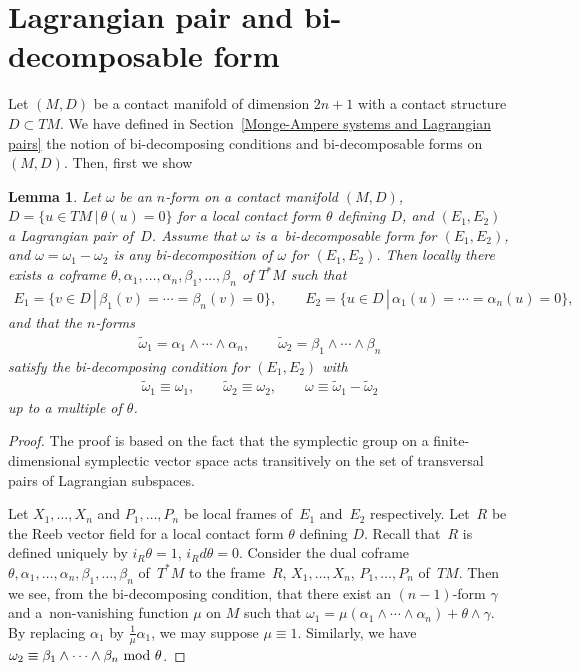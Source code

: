 \documentclass[11pt]{article}
\newtheorem{Lem}[Th]{Lemma}
{ \theoremstyle{definition}
\newtheorem{Def}[Th]{Definition}
\newtheorem{Rem}[Th]{Remark}
\newtheorem{Ex}[Th]{Example}}
\begin{document}
\section{Lagrangian pair and bi-decomposable form}
\label{Lagrangian pair and bi-decomposable forms.}

Let $(M, D)$ be a contact manifold of dimension $2n+1$ with
a contact structure $D \subset TM$.
We have def\/ined in Section~\ref{Monge-Ampere systems and Lagrangian pairs} the notion of bi-decomposing
conditions and bi-decomposable forms on~$(M, D)$.
Then, f\/irst we show

\begin{Lem}
\label{bi-decomposability}
Let $\omega$ be an $n$-form on a contact manifold $(M, D)$,
$D = \{ u \in TM \,|\, \theta(u) = 0\}$
for a local contact form $\theta$ defining $D$,
and $(E_1, E_2)$
a Lagrangian pair of~$D$.
Assume that $\omega$ is
a~bi-decomposable form for $(E_1, E_2)$,
and $\omega = \omega_1 - \omega_2$ is
any bi-decomposition of $\omega$ for $(E_1, E_2)$.
Then locally there exists a coframe
$\theta, \alpha_1, \dots, \alpha_n, \beta_1, \dots, \beta_n$
of $T^*M$ such that
\begin{gather*}
E_1 = \{ v \in D \,|\, \beta_1(v) = \cdots = \beta_n(v) = 0\}, \qquad
E_2 = \{ u \in D \,|\, \alpha_1(u) = \cdots = \alpha_n(u) = 0\},
\end{gather*}
and that the $n$-forms
\begin{gather*}
\widetilde{\omega}_1 = \alpha_1\wedge \cdots \wedge \alpha_n,
\qquad
\widetilde{\omega}_2 = \beta_1\wedge \cdots \wedge \beta_n
\end{gather*}
satisfy the bi-decomposing condition for
$(E_1, E_2)$ with
\begin{gather*}
\widetilde{\omega}_1 \equiv \omega_1, \qquad
\widetilde{\omega}_2 \equiv \omega_2, \qquad
\omega \equiv \widetilde{\omega}_1 - \widetilde{\omega}_2
\end{gather*}
up to a multiple of $\theta$.
\end{Lem}

\begin{proof}
The proof is based on the fact that the symplectic group on a f\/inite-dimensional symplectic vector space
acts transitively on the set of transversal pairs of Lagrangian subspaces.

Let $X_1, \dots, X_n$ and $P_1, \dots, P_n$ be local frames
of~$E_1$ and~$E_2$ respectively.
Let~$R$ be the Reeb vector f\/ield
for a local contact form $\theta$ def\/ining $D$. Recall that~$R$ is def\/ined uniquely by $i_R \theta = 1$, $i_R d\theta = 0$.
Consider
the dual coframe $\theta, \alpha_1,\dots,\alpha_n, \beta_1,\dots,\beta_n$
of~$T^*M$
to the frame~$R$, $X_1, \dots, X_n$, $P_1, \dots, P_n$ of~$TM$.
Then we see, from the bi-decomposing condition,
that there exist an $(n-1)$-form $\gamma$ and a~non-vanishing function $\mu$ on $M$ such that
$\omega_1 = \mu(\alpha_1 \wedge \cdots \wedge \alpha_n) + \theta\wedge\gamma$.
By replacing $\alpha_1$ by $\frac1{\mu}\alpha_1$,
we may suppose $\mu \equiv 1$.
Similarly, we have $\omega_2 \equiv
\beta_1 \wedge \cdots \wedge \beta_n \ \rm{mod}\ \theta$.
\end{proof}
\end{document}
